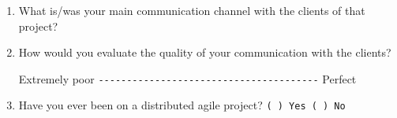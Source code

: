 \documentclass[lnbip]{svmultln}
\begin{document}
\begin{enumerate}
\item What is/was your main communication channel with the
  clients of that project?
  \vspace{8pt}

\item How would you evaluate the quality of your communication with
  the clients?

  Extremely poor \verb=---------------------------------------=
  Perfect \vspace{8pt}

\item Have you ever been on a distributed agile project?
  \verb=( ) Yes ( ) No= \vspace{8pt}


\end{enumerate}
\end{document}
